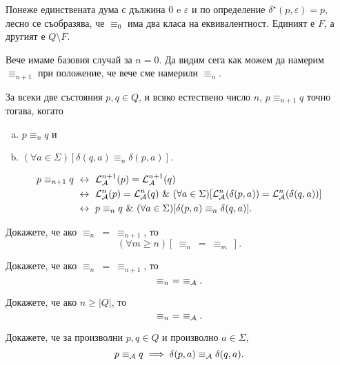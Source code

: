 Понеже единствената дума с дължина $0$ e $\varepsilon$ и по определение $\delta^\star(p,\varepsilon) = p$, 
лесно се съобразява, че $\equiv_0$ има два класа на еквивалентност.
Единият е $F$, а другият е $Q\setminus F$.

Вече имаме базовия случай за $n=0$.
Да видим сега как можем да намерим $\equiv_{n+1}$ при положение, че вече сме намерили $\equiv_n$.
\begin{framed}
  \begin{prop}
    \label{pr:one-letter-test}
    За всеки две състояния $p,q \in Q$, и всяко естествено число $n$, $p \equiv_{n+1} q$ точно тогава, когато
    \begin{enumerate}[a)]
    \item
      $p \equiv_{n} q$ и
    \item
      $(\forall a \in \Sigma)[\delta(q,a) \equiv_{n} \delta(p,a)]$.
    \end{enumerate}
  \end{prop}  
\end{framed}
\begin{hint}
  \begin{align*}
    p \equiv_{n+1} q & \iff \L^{n+1}_\A(p) = \L^{n+1}_\A(q)\\
                     & \iff \L^n_\A(p) = \L^n_\A(q)\ \&\ (\forall a \in \Sigma)[\L^n_\A(\delta(p,a)) = \L^n_\A(\delta(q,a))]\\
                     & \iff p \equiv_n q\ \&\ (\forall a \in \Sigma)[\delta(p,a) \equiv_n \delta(q,a)].
  \end{align*}
\end{hint}

\begin{problem}
  Докажете, че ако $\equiv_n\ =\ \equiv_{n+1}$, то
  \[(\forall m \geq n)[\ \equiv_n\ =\ \equiv_m\ ].\]
\end{problem}

\begin{problem}
  Докажете, че ако $\equiv_n\ =\ \equiv_{n+1}$, то
  \[\equiv_n\ =\ \equiv_{\mathcal{A}}.\]
\end{problem}

\begin{problem}
  Докажете, че ако $n \geq |Q|$, то
  \[\equiv_n\ =\ \equiv_{\mathcal{A}}.\]
\end{problem}

\begin{problem}
  Докажете, че за произволни $p,q \in Q$ и произволно $a\in\Sigma$,
  \[p \equiv_{\mathcal{A}} q \implies \delta(p,a) \equiv_{\mathcal{A}} \delta(q,a).\]
\end{problem}

